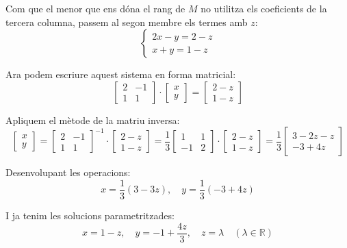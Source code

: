 \documentclass[12pt]{article}
\begin{document}
\begin{exemple}
Com que el menor que ens dóna el rang de \(M\) no utilitza els coeficients de la tercera columna, passem al segon membre els termes amb \(z\):
\[
\begin{cases}
2x - y = 2 - z \\
x + y = 1 - z
\end{cases}
\]

Ara podem escriure aquest sistema en forma matricial:
\[
\begin{bmatrix}
2 & -1 \\
1 & 1
\end{bmatrix}
\cdot
\begin{bmatrix}
x \\ y
\end{bmatrix}
=
\begin{bmatrix}
2 - z \\ 1 - z
\end{bmatrix}
\]

Apliquem el mètode de la matriu inversa:
\[
\begin{bmatrix}
x \\ y
\end{bmatrix}
=
\begin{bmatrix}
2 & -1 \\
1 & 1
\end{bmatrix}^{-1}
\cdot
\begin{bmatrix}
2 - z \\ 1 - z
\end{bmatrix}
=
\frac{1}{3}
\begin{bmatrix}
1 & 1 \\
-1 & 2
\end{bmatrix}
\cdot
\begin{bmatrix}
2 - z \\ 1 - z
\end{bmatrix}
=
\frac{1}{3}
\begin{bmatrix}
3 - 2z - z \\ -3 + 4z
\end{bmatrix}
\]

Desenvolupant les operacions:
\[
x = \frac{1}{3}(3 - 3z), \quad y = \frac{1}{3}(-3 + 4z)
\]

I ja tenim les solucions parametritzades:
\[
x = 1 - z, \quad y = -1 + \frac{4z}{3}, \quad z = \lambda \quad (\lambda \in \mathbb{R})
\]

\end{exemple}
\end{document}
